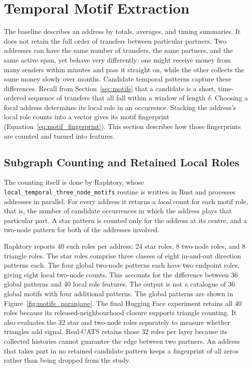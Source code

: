 \documentclass{thesisclass}
\begin{document}
\section{Temporal Motif Extraction}
\label{sec:motif_extraction}

The baseline describes an address by totals, averages, and timing summaries.
It does not retain the full order of transfers between particular partners.
Two addresses can have the same number of
transfers, the same partners, and the same active span, yet behave very
differently: one might receive money from many senders within minutes and pass
it straight on, while the other collects the same money slowly over months.
Candidate temporal patterns capture these differences. Recall from
Section~\ref{sec:motifs} that a candidate is a short, time-ordered sequence of
transfers that all fall within a window of length $\delta$. Choosing a focal
address determines its local role in an occurrence. Stacking the address's
local role counts into a vector gives its motif fingerprint
(Equation~\ref{eq:motif_fingerprint}). This section describes how those
fingerprints are counted and turned into features.

\subsection{Subgraph Counting and Retained Local Roles}
\label{sec:motifcountingandretainedroles}

The counting itself is done by Raphtory, whose
\texttt{local\_temporal\_three\_node\_motifs} routine is written in Rust and
processes addresses in parallel. For every address it returns a \emph{local}
count for each motif role, that is, the number of candidate occurrences in
which the address plays that particular part. A star pattern is counted only for
the address at its centre, and a two-node pattern for both of the addresses
involved.

Raphtory reports 40 such roles per address: 24 star roles, 8 two-node roles, and
8 triangle roles. The star roles comprise three classes of eight in-and-out
direction patterns each. The four global two-node patterns each have two
endpoint roles, giving eight local two-node counts. This accounts for the
difference between 36 global patterns and 40 local role features. The output
is not a catalogue of 36 global motifs with four additional patterns.
The global patterns are shown in
Figure~\ref{fig:motifs_paranjape}. The final Hugging Face experiment retains all
40 roles because its released-neighbourhood closure supports triangle counting.
It also evaluates the 32 star and two-node roles separately to measure whether
triangles add signal. Real-CATS retains those 32 roles per layer because its
collected histories cannot guarantee the edge between two partners. An address
that takes part in no retained candidate pattern keeps a fingerprint of all zeros rather
than being dropped from the study.
\end{document}

